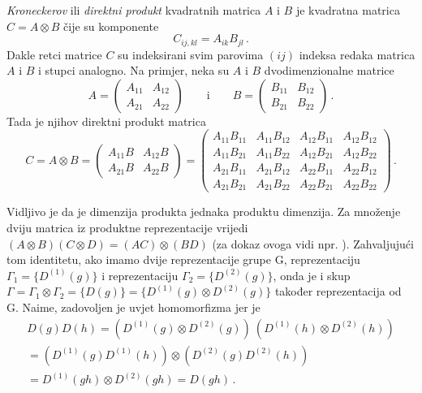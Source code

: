 \emph{Kroneckerov} ili \emph{direktni produkt} kvadratnih matrica 
$A$ i $B$ je kvadratna matrica $C=A\otimes B$ čije su komponente
\begin{displaymath}
          C_{ij,kl}=A_{ik}B_{jl} \,.
\end{displaymath}
Dakle retci matrice $C$ su indeksirani svim parovima $(ij)$ indeksa
redaka matrica $A$ i $B$ i stupci analogno.
Na primjer, neka su $A$ i $B$ dvodimenzionalne matrice
\begin{displaymath}
A= \begin{pmatrix}
    A_{11} & A_{12} \\
    A_{21} & A_{22}
\end{pmatrix} \qquad \text{i} \qquad
B= \begin{pmatrix}
    B_{11} & B_{12} \\
    B_{21} & B_{22}
\end{pmatrix} \,.
\end{displaymath}
Tada je njihov direktni produkt matrica
\begin{displaymath}
C=A\otimes B= 
 \begin{pmatrix}
    A_{11} B & A_{12} B \\
    A_{21} B & A_{22} B
\end{pmatrix} =
\begin{pmatrix}
  A_{11}B_{11} & A_{11}B_{12} & A_{12}B_{11} & A_{12}B_{12} \\
  A_{11}B_{21} & A_{11}B_{22} & A_{12}B_{21} & A_{12}B_{22} \\
  A_{21}B_{11} & A_{21}B_{12} & A_{22}B_{11} & A_{22}B_{12} \\
  A_{21}B_{21} & A_{21}B_{22} & A_{22}B_{21} & A_{22}B_{22} 
\end{pmatrix} \,.
\end{displaymath}

Vidljivo je da je dimenzija produkta jednaka produktu dimenzija.
Za množenje dviju matrica iz produktne reprezentacije
vrijedi $(A\otimes B)(C\otimes D)=(AC)\otimes(BD)$
(za dokaz ovoga vidi npr. \cite{Jones:1998}).
Zahvaljujući tom identitetu, ako imamo dvije reprezentacije grupe G,
reprezentaciju $\Gamma_{1}=\{D^{(1)}(g)\}$
 i reprezentaciju $\Gamma_{2}=\{D^{(2)}(g)\}$,
onda je i skup $\Gamma=\Gamma_1 \otimes \Gamma_2 = \{D(g)\}=
\{D^{(1)}(g)\otimes D^{(2)}(g)\}$ također reprezentacija od G.
Naime, zadovoljen je uvjet homomorfizma jer je
\begin{multline*}
D(g)D(h)=(D^{(1)}(g)\otimes D^{(2)}(g))\: (D^{(1)}(h)\otimes
  D^{(2)}(h)) \\
  = (D^{(1)}(g)D^{(1)}(h))\otimes
 (D^{(2)}(g)D^{(2)}(h)) \\
 = D^{(1)}(gh)\otimes D^{(2)}(gh) = D(gh) \,.
\end{multline*}



